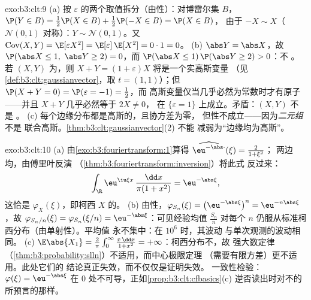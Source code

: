 \begin{solution}{exo:b3:clt:9}
(a) 按
$\varepsilon$ 的两个取值拆分（由性）：对博雷尔集 $B$，$\P(Y \in B) =
\frac12\P(X \in B) + \frac12\P(-X \in B) = \P(X \in B)$，
由于 $-X \sim X$（$\mathcal N(0,1)$ 对称）：$Y \sim
\mathcal N(0,1)$。又 $\operatorname{Cov}(X, Y) =
\E[\varepsilon X^2] = \E[\varepsilon]\,\E[X^2] = 0 \cdot 1 =
0$。
(b) $\abs Y = \abs X$，故 $\P(\abs X \leq 1,\ \abs Y \geq 2)
= 0$，而 $\P(\abs X \leq 1)\,\P(\abs Y \geq 2) > 0$：不
。若 $(X, Y)$ 为，则 $X + Y =
(1 + \varepsilon)X$ 将是一个实高斯变量
（见\cref{def:b3:clt:gaussianvector}，取 $t = (1,1)$）；但
$\P(X + Y = 0) = \P(\varepsilon = -1) = \frac12$，而
高斯变量仅当几乎必然为常数时才有原子
——并且 $X + Y$ 几乎必然等于 $2X \neq 0$，
在 $\{\varepsilon = 1\}$ 上成立。矛盾：$(X, Y)$ 不是
。
(c) 每个边缘分布都是高斯的，且协方差为零，
但性不成立——因为\emph{二元组}不是
联合高斯。\cref{thm:b3:clt:gaussianvector}(2) 不能
减弱为“边缘均为高斯”。
\end{solution}

\begin{solution}{exo:b3:clt:10}
(a) 由\cref{exo:b3:fouriertransform:1}算得
$\widehat{\eu^{-\abs\cdot}}(\xi) = \frac{2}{1 + \xi^2}$；
两边均，由傅里叶反演
（\cref{thm:b3:fouriertransform:inversion}）将此式
反过来：
\[
\int_\R\eu^{\iu\xi x}\,\frac{\dd x}{\pi(1 + x^2)} =
\eu^{-\abs\xi},
\]
这恰是 $\varphi_X(\xi)$，即柯西 $X$ 的。
(b) 由性，$\varphi_{S_n}(\xi) =
\bigl(\eu^{-\abs\xi}\bigr)^n = \eu^{-n\abs\xi}$，故
$\varphi_{S_n/n}(\xi) = \varphi_{S_n}(\xi/n) =
\eu^{-\abs\xi}$：可见经验均值 $\frac{S_n}n$
对每个 $n$ 仍服从标准柯西分布（由单射性）。平均值
永不集中：在 $10^6$ 时，其波动
与单次观测的波动相同。
(c) $\E\abs{X_1} = \frac2\pi\int_0^\infty\frac{x\,\dd x}{1 +
x^2} = +\infty$：柯西分布不，故
强大数定律
（\cref{thm:b3:probability:slln}）不适用，而中心极限定理
（需要有限方差）更不适用。此处它们的
结论真正失效，而不仅仅是证明失效。
一致性检验：$\varphi(\xi) = \eu^{-\abs\xi}$ 在
$0$ 处不可导，正如\cref{prop:b3:clt:cfbasics}(c)
逆否读出时对不的
所预言的那样。
\end{solution}


